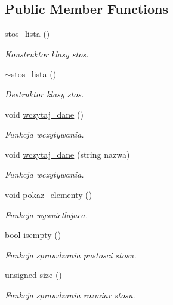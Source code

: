 \subsection*{Public Member Functions}
\begin{DoxyCompactItemize}
\item 
\hyperlink{classstos__lista_af779e46538f7fec8b2ecdd6469ead07c}{stos\-\_\-lista} ()
\begin{DoxyCompactList}\small\item\em Konstruktor klasy stos. \end{DoxyCompactList}\item 
\hyperlink{classstos__lista_a41eabf2ed23d39a334345484896857ed}{$\sim$stos\-\_\-lista} ()
\begin{DoxyCompactList}\small\item\em Destruktor klasy stos. \end{DoxyCompactList}\item 
void \hyperlink{classstos__lista_a33781da85b24ffc9d6a6f5b470eaa654}{wczytaj\-\_\-dane} ()
\begin{DoxyCompactList}\small\item\em Funkcja wczytywania. \end{DoxyCompactList}\item 
void \hyperlink{classstos__lista_a3ee1e31107ca47737451d808c85f2167}{wczytaj\-\_\-dane} (string nazwa)
\begin{DoxyCompactList}\small\item\em Funkcja wczytywania. \end{DoxyCompactList}\item 
void \hyperlink{classstos__lista_afd27e50bafd3f39fec49568522cc61b2}{pokaz\-\_\-elementy} ()
\begin{DoxyCompactList}\small\item\em Funkcja wyswietlajaca. \end{DoxyCompactList}\item 
bool \hyperlink{classstos__lista_abce2b3948d8a5dd5f62bfc985d97fe54}{isempty} ()
\begin{DoxyCompactList}\small\item\em Funkcja sprawdzania pustosci stosu. \end{DoxyCompactList}\item 
unsigned \hyperlink{classstos__lista_a36fa9223746729efa49ffad6001e87ae}{size} ()
\begin{DoxyCompactList}\small\item\em Funkcja sprawdzania rozmiar stosu. \end{DoxyCompactList}\item 

\end{DoxyCompactItemize}

